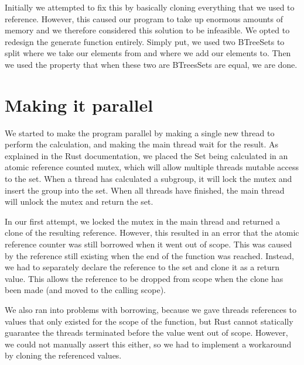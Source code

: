 \documentclass{article}
\begin{document}
Initially we attempted to fix this by basically cloning everything that we used to reference. However, this
caused our program to take up enormous amounts of memory and we therefore considered this solution to be
infeasible. We opted to redesign the generate function entirely. Simply put, we used two BTreeSets to split
where we take our elements from and where we add our elements to. Then we used the property that when these
two are BTreesSets are equal, we are done.

\section{Making it parallel}

We started to make the program parallel by making a single new thread to perform the calculation, and making the main thread wait for the result. As explained in the Rust documentation, we placed the Set being calculated in an atomic reference counted mutex, which will allow multiple threads mutable access to the set. When a thread has calculated a subgroup, it will lock the mutex and insert the group into the set. When all threads have finished, the main thread will unlock the mutex and return the set.

In our first attempt, we locked the mutex in the main thread and returned a clone of the resulting reference. However, this resulted in an error that the atomic reference counter was still borrowed when it went out of scope. This was caused by the reference still existing when the end of the function was reached. Instead, we had to separately declare the reference to the set and clone it as a return value. This allows the reference to be dropped from scope when the clone has been made (and moved to the calling scope).

We also ran into problems with borrowing, because we gave threads references to values that only existed for the scope of the function, but Rust cannot statically guarantee the threads terminated before the value went out of scope. However, we could not manually assert this either, so we had to implement a workaround by cloning the referenced values.
\end{document}
